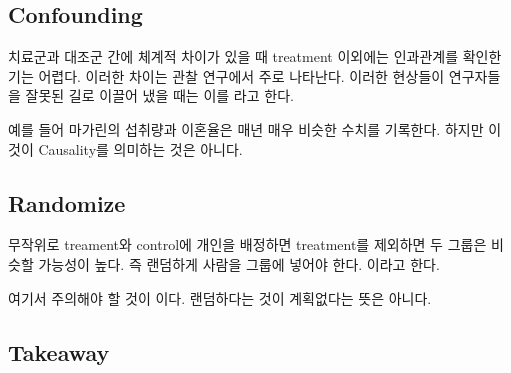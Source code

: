 \documentclass[../Data_Science.tex]{subfiles}
\begin{document}
\subsection{Confounding}\label{subsec:Confounding}
치료군과 대조군 간에 체계적 차이가 있을 때 treatment 이외에는 인과관계를 확인한기는 어렵다.
이러한 차이는 관찰 연구에서 주로 나타난다.
이러한 현상들이 연구자들을 잘못된 길로 이끌어 냈을 때는 이를 라고 한다.

예를 들어 마가린의 섭취량과 이혼율은 매년 매우 비슷한 수치를 기록한다. 하지만 이것이 Causality를 의미하는 것은 아니다.

\subsection{Randomize}\label{subsec:Randomize}
무작위로 treament와 control에 개인을 배정하면 treatment를 제외하면 두 그룹은 비슷할 가능성이 높다.
즉 랜덤하게 사람을 그룹에 넣어야 한다. 이라고 한다.

여기서 주의해야 할 것이 이다. 랜덤하다는 것이 계획없다는 뜻은 아니다.
\subsection{Takeaway}\label{subsec:Takeaway}
\end{document}
